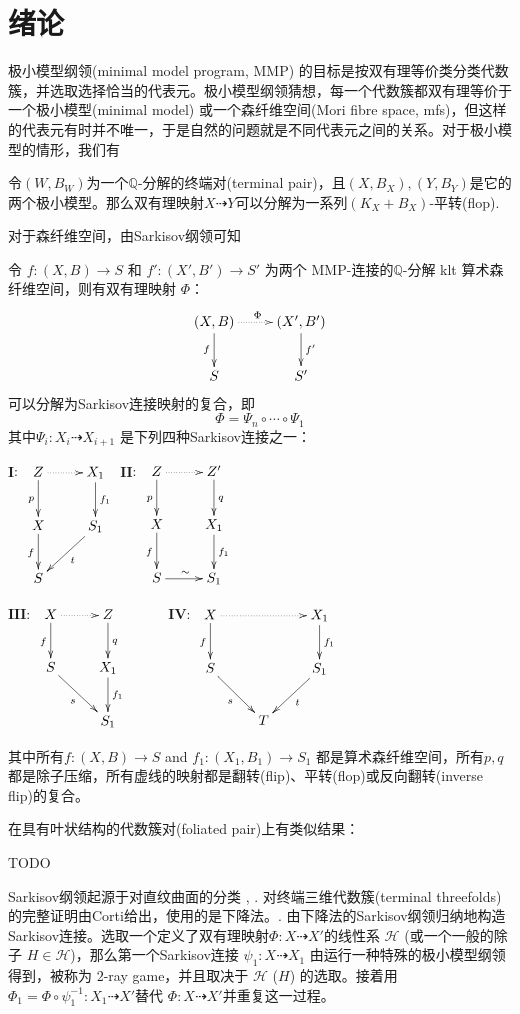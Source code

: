 \chapter{绪论}
极小模型纲领(minimal model program, MMP) 的目标是按双有理等价类分类代数簇，并选取选择恰当的代表元。极小模型纲领猜想，每一个代数簇都双有理等价于一个极小模型(minimal model) 或一个森纤维空间(Mori fibre space, mfs)，但这样的代表元有时并不唯一，于是自然的问题就是不同代表元之间的关系。对于极小模型的情形，我们有
\begin{theorem}[平转连接极小模型]
	令$(W,B_{W})$为一个$\mathbb{Q}$-分解的终端对(terminal pair)，且$(X,B_{X}),(Y,B_{Y})$是它的两个极小模型。那么双有理映射$X \dashrightarrow Y$可以分解为一系列$(K_{X}+B_{X})$-平转(flop).
\end{theorem}
对于森纤维空间，由Sarkisov纲领可知
\begin{theorem}[主定理]
	令 $ f:(X, B)\to S$ 和 $f':(X', B')\to S' $ 为两个 MMP-连接的$ \mathbb{Q} $-分解 klt 算术森纤维空间，则有双有理映射 $\Phi$：
	\[
		\xymatrix{
			(X,B)\ar[d]_f\ar@{.>}[r]^\Phi & (X',B')\ar[d]^{f'}\\
			S & S'}
	\]
	可以分解为Sarkisov连接映射的复合，即
	\[
		\Phi=\Psi_{n}\circ \cdots \circ \Psi_{1}
	\]
	其中$\Psi_{i}:X_{i}\dashrightarrow X_{i+1} $ 是下列四种Sarkisov连接之一：

	$\textbf{I}$:
	$\xymatrix{
			Z\ar[d]_p\ar@{.>}[r]&X_1\ar[d]^{f_1}\\
			X\ar[d]_f&S_1\ar[dl]^{t}\\
			S &}$
	$\textbf{II}$:
	$\xymatrix{
			Z\ar[d]_p\ar@{.>}[r]&Z'\ar[d]^{q}&\\
			X\ar[d]_{f}&X_1\ar[d]^{f_1}\\
			S\ar[r]^{\sim}&S_1}$

	$\textbf{III}$:
	$
		\xymatrix{
		X\ar@{.>}[r]\ar[d]_f& Z\ar[d]^q& \\
		S\ar[rd]_{s}         & X_{1}\ar[d]^{f_{1}}&\\
		&S_{1}
		}
	$
	$\textbf{IV}$:
	$\xymatrix{
			X\ar[d]_f\ar@{.>}[rr]&&X_1\ar[d]^{f_1}\\
			S\ar[dr]_{s}&&S_1\ar[dl]^{t}\\
			&T &}$

	其中所有$ f:(X, B)\to S $ and $ f_1:(X_1, B_1)\to S_1 $ 都是算术森纤维空间，所有$p,q$ 都是除子压缩，所有虚线的映射都是翻转(flip)、平转(flop)或反向翻转(inverse flip)的复合。
\end{theorem}
在具有叶状结构的代数簇对(foliated pair)上有类似结果：
\begin{theorem}[主定理2]
	TODO
\end{theorem}
Sarkisov纲领起源于对直纹曲面的分类 \cite{sarkisovBIRATIONALAUTOMORPHISMSCONIC1981}, \cite{sarkisovCONICBUNDLESTRUCTURES1983}.
对终端三维代数簇(terminal threefolds)的完整证明由Corti给出，使用的是下降法。\cite{cortiFactoringBirationalMaps}.
由下降法的Sarkisov纲领归纳地构造Sarkisov连接。选取一个定义了双有理映射$\Phi:X \dashrightarrow X'$的线性系 $\mathcal{H}$ (或一个一般的除子 $H \in \mathcal{H}$)，那么第一个Sarkisov连接 $\psi_1:X\dashrightarrow X_1$ 由运行一种特殊的极小模型纲领得到，被称为 $2$-ray game，并且取决于 $\mathcal{H}$ ($H$) 的选取。接着用 $\Phi_{1}=\Phi\circ \psi_1^{-1}: X_1 \dashrightarrow X'$替代 $\Phi:X\dashrightarrow X'$并重复这一过程。

